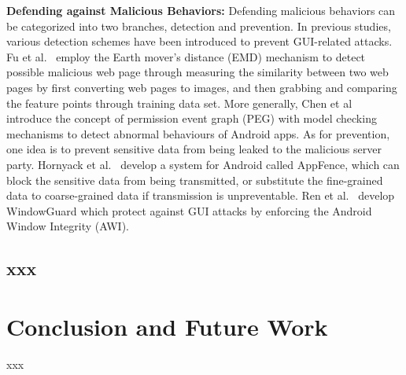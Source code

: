 \documentclass[letterpaper,12pt]{article}
\begin{document}
\textbf{Defending against Malicious Behaviors:} Defending malicious
behaviors can be categorized into two branches, detection and
prevention. In previous studies, various detection schemes have been
introduced to prevent GUI-related attacks. Fu
et al.~\cite{detectpswebsite} employ the Earth mover's distance (EMD)
mechanism to detect possible malicious web page through measuring the
similarity between two web pages by first converting web pages to
images, and then grabbing and comparing the feature points through
training data set. More generally, Chen et al~\cite{peg} introduce the
concept of permission event graph (PEG) with model checking mechanisms
to detect abnormal behaviours of Android apps. As for prevention, one
idea is to prevent sensitive data from being leaked to the malicious
server party. Hornyack et al.~\cite{AppFence} develop a
system for Android called AppFence, which can block the sensitive data
from being transmitted, or substitute the fine-grained data to
coarse-grained data if transmission is unpreventable. Ren
et al.~\cite{Windowguard} develop WindowGuard which protect against GUI
attacks by enforcing the Android Window Integrity (AWI).

   \newpage
   \begin{singlespace}
   \section{xxx}\label{sec:dssnassociate}
   \end{singlespace}

\section{Conclusion and Future Work}\label{sec:conclusion}

xxx


        \newpage
   
   
\end{document}
